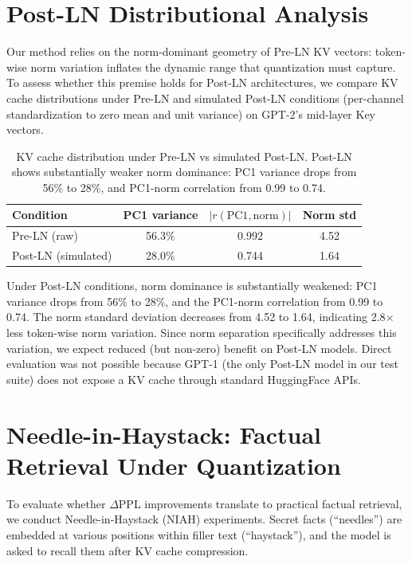 \documentclass[11pt]{article}
\begin{document}
\section{Post-LN Distributional Analysis}
\label{sec:postln}

Our method relies on the norm-dominant geometry of Pre-LN KV vectors: token-wise norm variation inflates the dynamic range that quantization must capture. To assess whether this premise holds for Post-LN architectures, we compare KV cache distributions under Pre-LN and simulated Post-LN conditions (per-channel standardization to zero mean and unit variance) on GPT-2's mid-layer Key vectors.

\begin{table}[h]
\centering
\small
\begin{tabular}{lccc}
\toprule
Condition & PC1 variance & $|r(\text{PC1}, \text{norm})|$ & Norm std \\
\midrule
Pre-LN (raw) & 56.3\% & 0.992 & 4.52 \\
Post-LN (simulated) & 28.0\% & 0.744 & 1.64 \\
\bottomrule
\end{tabular}
\caption{KV cache distribution under Pre-LN vs simulated Post-LN. Post-LN shows substantially weaker norm dominance: PC1 variance drops from 56\% to 28\%, and PC1-norm correlation from 0.99 to 0.74.}
\label{tab:postln}
\end{table}

Under Post-LN conditions, norm dominance is substantially weakened: PC1 variance drops from 56\% to 28\%, and the PC1-norm correlation from 0.99 to 0.74. The norm standard deviation decreases from 4.52 to 1.64, indicating 2.8$\times$ less token-wise norm variation. Since norm separation specifically addresses this variation, we expect reduced (but non-zero) benefit on Post-LN models. Direct evaluation was not possible because GPT-1 (the only Post-LN model in our test suite) does not expose a KV cache through standard HuggingFace APIs.

\section{Needle-in-Haystack: Factual Retrieval Under Quantization}
\label{sec:niah}

To evaluate whether $\Delta$PPL improvements translate to practical factual retrieval, we conduct Needle-in-Haystack (NIAH) experiments. Secret facts (``needles'') are embedded at various positions within filler text (``haystack''), and the model is asked to recall them after KV cache compression.
\end{document}
